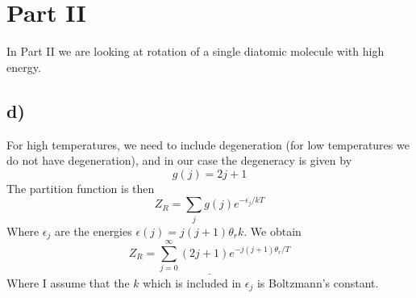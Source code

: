 \documentclass{scrartcl}
\begin{document}
\section*{Part II}
In Part II we are looking at rotation of a single diatomic molecule with high energy.
 
\subsection*{d)}
For high temperatures, we need to include degeneration (for low temperatures we do not have degeneration), and in our case the degeneracy is given by 
\begin{equation}
g(j)=2j+1
\end{equation}
The partition function is then
\begin{equation}
Z_R=\sum_j g(j) e^{-\epsilon_j/kT}
\end{equation}
Where $\epsilon_j$ are the energies $\epsilon(j)=j(j+1)\theta_rk$. We obtain
\begin{equation}
\underline{Z_R= \sum_{j=0}^\infty (2j+1)e^{-j(j+1)\theta_r/T}}
\end{equation}
Where I assume that the $k$ which is included in $\epsilon_j$ is Boltzmann's constant.
\end{document}
